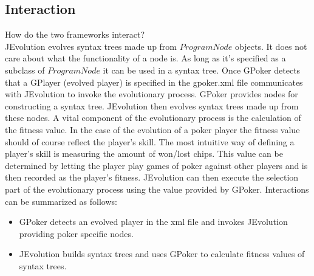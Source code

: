 	\subsection{Interaction}
	How do the two frameworks interact? \\
	JEvolution evolves syntax trees made up from $ProgramNode$ objects. It does not care about what the functionality of a node is. As long
	as it's specified as a subclass of $ProgramNode$ it can be used in a syntax tree.
	Once GPoker detects that a GPlayer (evolved player) is specified in the gpoker.xml file communicates with JEvolution to invoke the evolutionary process.  GPoker provides nodes 
	for constructing a syntax tree. JEvolution then evolves syntax trees made up from these nodes. A vital component of the evolutionary process is the calculation of the fitness value. In the case
	of the evolution of a poker player the fitness value should of course reflect the player's skill. The most intuitive way of defining a player's skill is measuring the amount of won/lost chips.
	This value can be determined by letting the player play games of poker against other players and is then recorded as the player's fitness. JEvolution can then execute the selection part
	of the evolutionary process using the value provided by GPoker. 
	Interactions can be summarized as follows:
	\begin{itemize}
		\item GPoker detects an evolved player in the xml file and invokes JEvolution providing poker specific nodes.
		\item JEvolution builds syntax trees and uses GPoker to calculate fitness values of syntax trees.
	\end{itemize}
